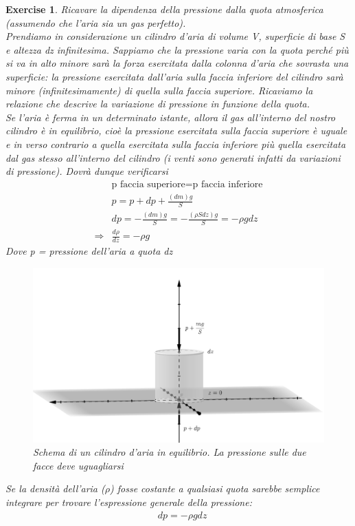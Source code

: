 \documentclass[10pt,a4paper]{article}
\newtheorem{exercise}{Exercise}
\begin{document}
\begin{exercise}\label{ex:pressione_quota}
Ricavare la dipendenza della pressione dalla quota atmosferica (assumendo che l’aria sia un gas perfetto).\\
Prendiamo in considerazione un cilindro d'aria di volume V, superficie di base S e altezza dz infinitesima. Sappiamo che la pressione varia con la quota perché più si va in alto minore sarà la forza esercitata dalla colonna d'aria che sovrasta una superficie: la pressione esercitata dall'aria sulla faccia inferiore del cilindro sarà minore (infinitesimamente) di quella sulla faccia superiore. Ricaviamo la relazione che descrive la variazione di pressione in funzione della quota.\\
Se l'aria è ferma in un determinato istante, allora il gas all'interno del nostro cilindro è in equilibrio, cioè la pressione esercitata sulla faccia superiore è uguale e in verso contrario a quella esercitata sulla faccia inferiore più quella esercitata dal gas stesso all'interno del cilindro (i venti sono generati infatti da variazioni di pressione). Dovrà dunque verificarsi
\begin{align}\label{eq:stevin}
	&\text{p faccia superiore} = \text{p faccia inferiore}\\
	&p  = p + dp \nonumber + \frac{(dm) g}{S}\\
	&dp = -\frac{(dm)g}{S} = -\frac{(\rho S dz) g}{S}= -\rho g dz \nonumber \\
	\Rightarrow & \frac{d\rho}{dz}= - \rho g
\end{align} 
Dove p = pressione dell'aria a quota dz
\begin{figure}[h!]
	\centering
	\includegraphics[width=0.5\linewidth]{../images/cilindro_aria}
	\caption{Schema di un cilindro d'aria in equilibrio. La pressione sulle due facce deve uguagliarsi}
	\label{fig:cilindroaria}
\end{figure}
\FloatBarrier
Se la densità dell'aria ($\rho$) fosse costante a qualsiasi quota sarebbe semplice integrare per trovare l'espressione generale della pressione:
\begin{align*} 
	&dp = -\rho  g dz \\

\end{align*}
\end{exercise}
\end{document}
